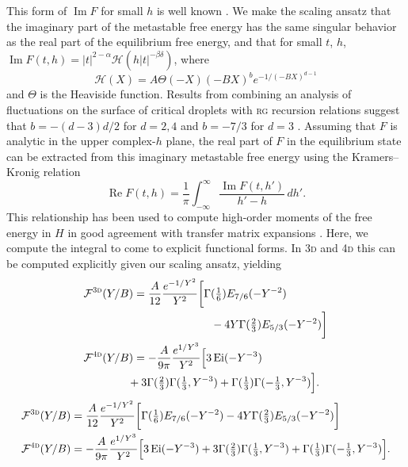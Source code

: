 \documentclass[aps,prl,reprint]{revtex4-1}
\def\[{\begin{equation}}
\def\]{\end{equation}}
\def\ei{\mathop{\mathrm{Ei}}\nolimits} %
\def\re{\mathop{\mathrm{Re}}\nolimits}
\def\im{\mathop{\mathrm{Im}}\nolimits}
\def\dd{d} %
\def\fF{\mathcal F}  %
\def\fiF{\mathcal H} %
\def\dim{d}
\def\threedee{\textsc{3d} }
\def\fourdee{\textsc{4d} }
\newif\ifreprint
\begin{document}
This form of $\im F$ for small $h$ is well known
\cite{langer.1967.condensation,harris.1984.metastability}.  We make the
scaling ansatz that the imaginary part of the metastable free energy has the
same singular behavior as the real part of the equilibrium free energy, and
that for small $t$, $h$, $\im F(t,h)=|t|^{2-\alpha}\fiF(h|t|^{-\beta\delta})$,
where
\[
  \fiF(X)=A\Theta(-X)(-BX)^be^{-1/(-BX)^{\dim-1}}
  \label{eq:im.scaling}
\]
and $\Theta$ is the Heaviside function. Results from combining an analysis of
fluctuations on the surface of critical droplets with \textsc{rg} recursion
relations suggest that $b=-(d-3)d/2$ for $d=2,4$ and $b=-7/3$ for $d=3$
\cite{houghton.1980.metastable,rudnick.1976.equations,gunther.1980.goldstone}.
Assuming that $F$ is analytic in the upper complex-$h$ plane, the real part of
$F$ in the equilibrium state can be extracted from this imaginary metastable
free energy using the Kramers--Kronig relation
\[
  \re F(t,h)=\frac1\pi\int_{-\infty}^\infty\frac{\im F(t,h')}{h'-h}\,\dd h'.
  \label{eq:kram-kron}
\]
This relationship has been used to compute high-order moments of the free
energy in $H$ in good agreement with transfer matrix expansions
\cite{lowe.1980.instantons}. Here, we compute the integral to come to explicit
functional forms.  In \threedee and \fourdee this can be computed explicitly
given our scaling ansatz, yielding
\def\eqthreedeeone{
  \fF^\threedee(Y/B)&=
  \frac{A}{12}\frac{e^{-1/Y^2}}{Y^2}
  \bigg[\Gamma(\tfrac16)E_{7/6}(-Y^{-2})
}
\def\eqthreedeetwo{
  -4Y\Gamma(\tfrac23)E_{5/3}(-Y^{-2})\bigg]
}
\def\eqfourdeeone{
  \fF^\fourdee(Y/B)&=
  -\frac{A}{9\pi}\frac{e^{1/Y^3}}{Y^2}
  \Big[3\ei(-Y^{-3})
}
\def\eqfourdeetwo{
  +3\Gamma(\tfrac23)\Gamma(\tfrac13,Y^{-3})
  +\Gamma(\tfrac13)\Gamma(-\tfrac13,Y^{-3})\Big]
}
\ifreprint
\begin{align}
  &\begin{aligned}
    \eqthreedeeone\\
    &\hspace{7em}
    \eqthreedeetwo
  \end{aligned}
  \\
  &\begin{aligned}
    \eqfourdeeone
    \\
    &\hspace{-0.5em}
    \eqfourdeetwo.
  \end{aligned}
\end{align}
\else
\begin{align}
  \eqthreedeeone\eqthreedeetwo
  \\
  \eqfourdeeone\eqfourdeetwo.
\end{align}
\end{document}
